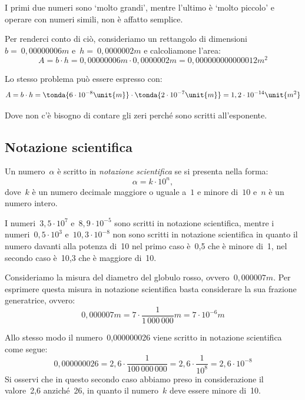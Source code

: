 I primi due numeri sono `molto grandi', mentre l'ultimo è `molto piccolo' e 
operare con numeri simili, non è affatto semplice.

Per renderci conto di ciò, consideriamo un rettangolo di dimensioni
\(b =~0,00000006\unit{m}\) e~\(h =~0,0000002\unit{m}\) e calcoliamone l'area:
\[A=b\cdot h=0,00000006\unit{m}\cdot0,0000002\unit{m}=
0,000000000000012\unit{m^2}\]

\begin{center}
\rett
% 
\end{center}

Lo stesso problema può essere espresso con:
\[A=b\cdot h=\tonda{6 \cdot 10^{-8}\unit{m}} \cdot
\tonda{2 \cdot 10^{-7}\unit{m}}=
1,2\cdot 10^{-14}\unit{m^2}\]

Dove non c'è bisogno di contare gli zeri perché sono scritti all'esponente.

\subsection{Notazione scientifica}
\begin{definizione}{}{}
Un numero~\(\alpha\) è scritto in \emph{notazione scientifica} se
si presenta nella forma:
\[\alpha=k\cdot10^n,\] 
dove~\(k\) è un numero decimale maggiore o uguale a~\(1\) e minore di~\(10\) 
e~\(n\) è un numero intero.
\end{definizione}

 \begin{esempio}{}{}
I numeri~\(3,5\cdot10^7\) e~\(8,9\cdot10^{-5}\) sono scritti in notazione 
scientifica, mentre i numeri~\(0,5\cdot10^3\) e~\(10,3\cdot 10^{-8}\) non 
sono scritti in notazione scientifica in quanto il numero davanti alla 
potenza di~10 nel primo caso è~0,5 che è minore di~1, nel secondo caso è~10,3 
che è maggiore di~10.
 \end{esempio}

Consideriamo la misura del diametro del globulo rosso, 
ovvero~\(0,000007\unit{m}\).
Per esprimere questa misura in notazione scientifica basta considerare la 
sua 
frazione generatrice, ovvero:
\[0,000007\unit{m}=7\cdot\frac{1}{1\,000\,000}\unit{m}=
  7\cdot10^{-6}\unit{m}\]

Allo stesso modo il numero~0,000000026 viene scritto in notazione 
scientifica 
come segue:
\[0,000000026=2,6\cdot\frac{1}{100\,000\,000}=
  2,6\cdot\frac{1}{10^8}=2,6\cdot10^{-8}\]
Si osservi che in questo secondo caso abbiamo preso in considerazione il 
valore~2,6 anziché~26, in quanto il numero~\(k\) deve essere minore di~10.

